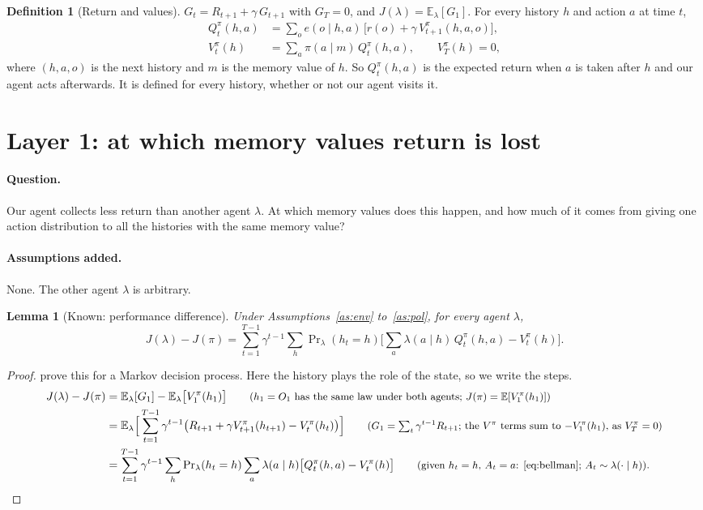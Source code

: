 \documentclass{article}
\newtheorem{lemma}[proposition]{Lemma}
\theoremstyle{definition}
\newtheorem{definition}[proposition]{Definition}
\numberwithin{equation}{section}
\newcommand{\E}{\mathbb{E}}
\newcommand{\Prl}{\Pr\nolimits_{\lambda}}
\newcommand{\why}[1]{\tag*{\small(#1)}}
\begin{document}
\begin{definition}[Return and values]\label{def:value}
$G_t=R_{t+1}+\gamma\,G_{t+1}$ with $G_T=0$, and $J(\lambda)=\E_\lambda[G_1]$. For every history $h$ and action $a$ at time $t$,
\begin{align}
Q^\pi_t(h,a)&=\sum_o e(o\mid h,a)\,\big[r(o)+\gamma\,V^\pi_{t+1}(h,a,o)\big], \label{eq:bellman}\\
V^\pi_t(h)&=\sum_a\pi(a\mid m)\,Q^\pi_t(h,a),\qquad V^\pi_T(h)=0, \nonumber
\end{align}
where $(h,a,o)$ is the next history and $m$ is the memory value of $h$. So $Q^\pi_t(h,a)$ is the expected return when $a$ is taken after $h$ and our agent acts afterwards. It is defined for every history, whether or not our agent visits it.
\end{definition}

\section{Layer 1: at which memory values return is lost}\label{sec:layer1}

\paragraph{Question.} Our agent collects less return than another agent $\lambda$. At which memory values does this happen, and how much of it comes from giving one action distribution to all the histories with the same memory value?

\paragraph{Assumptions added.} None. The other agent $\lambda$ is arbitrary.

\begin{lemma}[Known: performance difference]\label{lem:pdl}
Under Assumptions~\ref{as:env} to~\ref{as:pol}, for every agent $\lambda$,
\[
J(\lambda)-J(\pi)=\sum_{t=1}^{T-1}\gamma^{t-1}\sum_h\Prl (h_t=h)\Big[\sum_a\lambda(a\mid h)\,Q^\pi_t(h,a)-V^\pi_t(h)\Big].
\]
\end{lemma}

\begin{proof}
\citet{kakade2002cpi} prove this for a Markov decision process. Here the history plays the role of the state, so we write the steps.
\begin{align*}
J(\lambda)-J(\pi)
&=\E_\lambda[G_1]-\E_\lambda\big[V^\pi_1(h_1)\big] \why{$h_1=O_1$ has the same law under both agents; $J(\pi)=\E[V^\pi_1(h_1)]$}\\
&=\E_\lambda\Big[\sum_{t=1}^{T-1}\gamma^{t-1}\big(R_{t+1}+\gamma V^\pi_{t+1}(h_{t+1})-V^\pi_t(h_t)\big)\Big] \why{$G_1=\sum_t\gamma^{t-1}R_{t+1}$; the $V^\pi$ terms sum to $-V^\pi_1(h_1)$, as $V^\pi_T=0$}\\
&=\sum_{t=1}^{T-1}\gamma^{t-1}\sum_h\Prl (h_t=h)\sum_a\lambda(a\mid h)\big[Q^\pi_t(h,a)-V^\pi_t(h)\big] \why{given $h_t=h$, $A_t=a$: \eqref{eq:bellman}; $A_t\sim\lambda(\cdot\mid h)$}.
\end{align*}
\end{proof}
\end{document}

